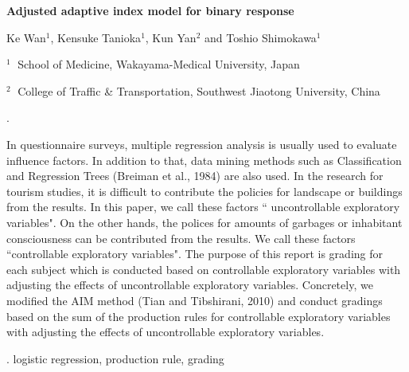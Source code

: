 \documentclass[12pt]{article}
\begin{document}
\begin{flushleft}


{\LARGE\bf Adjusted adaptive index model for binary response}

\vspace{1.0cm}
Ke Wan$^1$,  Kensuke Tanioka$^1$, Kun Yan$^2$ and Toshio Shimokawa$^1$

\begin{description}
\item $^1 \;$ School of Medicine, Wakayama-Medical University, Japan
\item $^2 \;$ College of Traffic \& Transportation, Southwest Jiaotong University, China
\end{description}

\end{flushleft}


\vspace{0.75cm}

. 

In questionnaire surveys,  
multiple regression analysis is usually used to %
evaluate influence factors.
In addition to that, 
data mining methods such as
Classification and Regression Trees (Breiman et al., 1984) are also used. 
In the research for tourism studies,
it is difficult to contribute the policies 
for landscape or buildings from the results.
In this paper, we call these factors `` uncontrollable exploratory variables".
On the other hands, 
the polices for amounts of garbages or inhabitant consciousness
can be contributed from the results.
We call these factors ``controllable exploratory variables".
%
The purpose of this report is grading for each subject which is conducted based on 
controllable exploratory variables with adjusting the effects of
uncontrollable exploratory variables.
%
Concretely, we modified the AIM method (Tian and Tibshirani, 2010)  and 
conduct gradings based on the sum of the production rules for 
controllable exploratory variables with adjusting the effects of uncontrollable exploratory variables.

\vskip 2mm

.
logistic regression, production rule, grading 


\end{document}
